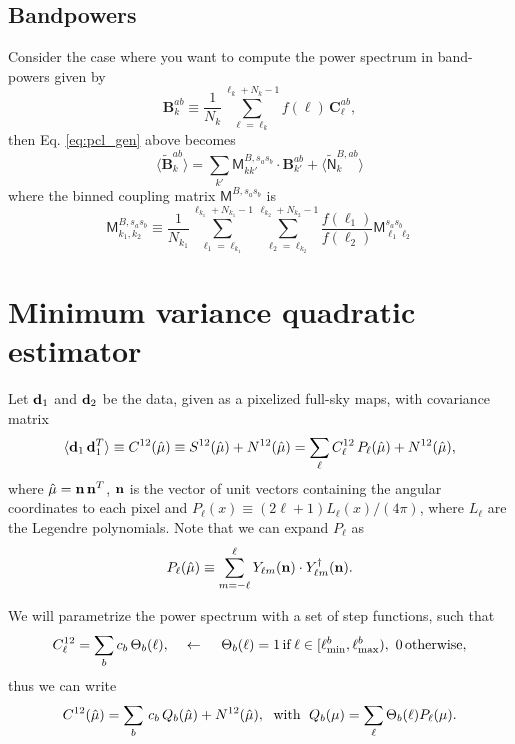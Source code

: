 \documentclass[a4paper,10pt]{article}
\begin{document}
\subsection{Bandpowers}
Consider the case where you want to compute the power spectrum in band-powers given by
\begin{equation}
  \mathbf{B}^{ab}_k\equiv\frac{1}{N_k}\sum_{\ell=\ell_k}^{\ell_k+N_k-1} f(\ell)\,\mathbf{C}^{ab}_\ell,
\end{equation}
then Eq. \ref{eq:pcl_gen} above becomes
\begin{equation}\label{eq:pcl_bin}
  \langle\tilde{\mathbf{B}}^{ab}_k\rangle=\sum_{k'}\mathsf{M}^{B,s_as_b}_{k k'}\cdot\mathbf{B}^{ab}_{k'}+
  \langle\tilde{\mathsf{N}}^{B,ab}_k\rangle
\end{equation}
where the binned coupling matrix $\mathsf{M}^{B,s_as_b}$ is
\begin{equation}
  \mathsf{M}^{B,s_as_b}_{k_1,k_2}\equiv\frac{1}{N_{k_1}}\sum_{\ell_1=\ell_{k_1}}^{\ell_{k_1}+N_{k_1}-1}\sum_{\ell_2=\ell_{k_2}}^{\ell_{k_2}+N_{k_2}-1}\frac{f(\ell_1)}{f(\ell_2)}
  \mathsf{M}^{s_as_b}_{\ell_1\ell_2}
\end{equation}

\section{Minimum variance quadratic estimator}

Let ${\bf d}_1$ and ${\bf d}_2$ be the data, given as a pixelized full-sky maps,
with covariance matrix
\begin{equation}
 \langle{\bf d}_1\,{\bf d}^T_1\rangle\equiv C^{12}(\hat{\mu})\equiv
 S^{12}(\hat{\mu})+N^{12}(\hat{\mu})=
 \sum_\ell C^{12}_\ell\,P_\ell(\hat{\mu})+N^{12}(\hat{\mu}),
\end{equation}
where $\hat{\mu}={\bf n}\,{\bf n}^T$, ${\bf n}$ is the vector of unit vectors
containing the angular coordinates to each pixel and $P_\ell(x)\equiv (2\ell+1)
L_\ell(x)/(4\pi)$, where $L_\ell$ are the Legendre polynomials. Note that we can
expand $P_\ell$ as
\begin{equation}
  P_\ell(\hat{\mu})\equiv\sum_{m=-\ell}^\ell
  Y_{\ell m}({\bf n})\cdot Y^\dag_{\ell m}({\bf n}).
\end{equation}

We will parametrize the power spectrum with a set of step functions, such that
\begin{equation}
 C^{12}_\ell=\sum_b c_b\,\Theta_b(\ell),\hspace{12pt}\leftarrow\hspace{12pt}
 \Theta_b(\ell)=1\,{\rm if}\,\ell\in[\ell^b_{\rm min},\ell^b_{\rm max}),
 \,\,0\,{\rm otherwise},
\end{equation}
thus we can write
\begin{equation}
  C^{12}(\hat{\mu})=\sum_b\,c_b\,Q_b(\hat{\mu})+N^{12}(\hat{\mu}),
  \hspace{6pt}{\rm with}\hspace{6pt}
  Q_b(\mu)=\sum_\ell\Theta_b(\ell)P_\ell(\mu).
\end{equation}
\end{document}

